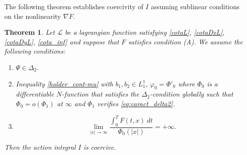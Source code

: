 \documentclass[twoside]{article}
\newtheorem{thm}{Theorem}[section]
\theoremstyle{remark}
\begin{document}
The following theorem establishes  coercivity of $I$ assuming sublinear conditions on the nonlinearity  $\nabla F$. 












\begin{thm}\label{coercitividad-r}
Let  $\mathcal{L}$ be a lagrangian function satisfying \eqref{cotaL}, \eqref{cotaDxL}, \eqref{cotaDyL}, \eqref{cota_inf}  and suppose that $F$ satisfies condition (A). We assume the following conditions:
\begin{enumerate}
\item $\Psi\in\Delta_2$.
\item Inequality \eqref{holder_cont-mu} with $b_1,b_2 \in L^1_1$,  $\varphi_0=\Phi'_0$ where $\Phi_0$ is a differentiable $N$-function that satisfies the $\Delta_2$-condition globally such that
$\Phi_0=o(\Phi_1)$ at $\infty$ and $\Phi_1$ verifies \eqref{eq:caract_delta2}.
\item 
\begin{equation}\label{eq:propiedad-coercividad-phi0}
\lim_{|x|\to\infty}\frac{\int_{0}^{T}F(t,x)\ dt}{\Phi_0(|x|)}=+\infty.
\end{equation}
\end{enumerate}
Then  the action integral $I$ is coercive.
\end{thm}
\end{document}
